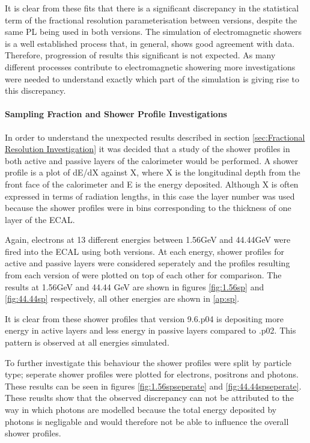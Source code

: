 It is clear from these fits that there is a significant discrepancy in the statistical term of the fractional resolution parameterisation between \geant versions, despite the same PL being used in both versions.  The simulation of electromagnetic showers is a well established process that, in general, shows good agreement with data.  Therefore, progression of results this significant is not expected.  As many different processes contribute to electromagnetic showering more investigations were needed to understand exactly which part of the simulation is giving rise to this discrepancy.

\paragraph{Sampling Fraction and Shower Profile Investigations}
\label{sec:Sampling Fraction and Shower Profile Investigations}
In order to understand the unexpected results described in section \ref{sec:Fractional Resolution Investigation} it was decided that a study of the shower profiles in both active and passive layers of the calorimeter would be performed.  A shower profile is a plot of dE/dX against X, where X is the longitudinal depth from the front face of the calorimeter and E is the energy deposited.  Although X is often expressed in terms of radiation lengths, in this case the layer number was used because the shower profiles were in bins corresponding to the thickness of one layer of the ECAL.

Again, electrons at 13 different energies between 1.56GeV and 44.44GeV were fired into the ECAL using both \geant versions.  At each energy, shower profiles for active and passive layers were considered seperately and the profiles resulting from each version of \geant were plotted on top of each other for comparison.  The results at 1.56GeV and 44.44 GeV are shown in figures \ref{fig:1.56sp} and \ref{fig:44.44sp} respectively, all other energies are shown in \ref{ap:sp}.

It is clear from these shower profiles that \geant version 9.6.p04 is depositing more energy in active layers and less energy in passive layers compared to .p02.  This pattern is observed at all energies simulated.

To further investigate this behaviour the shower profiles were split by particle type; seperate shower profiles were plotted for electrons, positrons and photons.  These results can be seen in figures \ref{fig:1.56spseperate}  and \ref{fig:44.44spseperate}.
These reuslts show that the observed discrepancy can not be attributed to the way in which photons are modelled because the total energy deposited by photons is negligable and would therefore not be able to influence the overall shower profiles.

